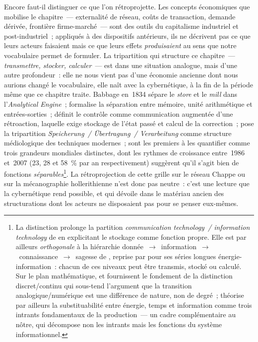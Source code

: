 Encore faut-il distinguer ce que l'on rétroprojette. Les concepts économiques que mobilise le chapitre~--- externalité de réseau, coûts de transaction, demande dérivée, frontière firme-marché~--- sont des outils du capitalisme industriel et post-industriel~; appliqués à des dispositifs antérieurs, ils ne décrivent pas ce que leurs acteurs faisaient mais ce que leurs effets \emph{produisaient} au sens que notre vocabulaire permet de formuler. La tripartition qui structure ce chapitre~--- \emph{transmettre, stocker, calculer}~--- est dans une situation analogue, mais d'une autre profondeur~: elle ne nous vient pas d'une économie ancienne dont nous aurions changé le vocabulaire, elle naît avec la cybernétique, à la fin de la période même que ce chapitre traite. Babbage en~1834 sépare le \emph{store} et le \emph{mill} dans l'\emph{Analytical Engine}~; \textcite{vonneumann_first_1945} formalise la séparation entre mémoire, unité arithmétique et entrées-sorties~; \textcite{wiener_cybernetics_1948} définit le contrôle comme communication augmentée d'une rétroaction, laquelle exige stockage de l'état passé et calcul de la correction~; \textcite{kittler_grammophon_1986} pose la tripartition \emph{Speicherung~/ \"Ubertragung~/ Verarbeitung} comme structure médiologique des techniques modernes~; \textcite{hilbert_worlds_2011} sont les premiers à les quantifier comme trois grandeurs mondiales distinctes, dont les rythmes de croissance entre~1986 et~2007 (23, 28 et 58~\% par an respectivement) suggèrent qu'il s'agit bien de fonctions \emph{séparables}\footnote{La distinction prolonge la partition \emph{communication technology~/ information technology} de \textcite{vanderkooij_invention_2015} en explicitant le stockage comme fonction propre. Elle est par ailleurs \emph{orthogonale} à la hiérarchie donnée~$\rightarrow$~information~$\rightarrow$~connaissance~$\rightarrow$~sagesse de \textcite{ackoff_data_1989}, reprise par \textcite{fouquet_digitalisation_2023} pour ses séries longues énergie-information~: chacun de ces niveaux peut être transmis, stocké ou calculé. Sur le plan mathématique, \textcite{bailly_mathematics_2011} et \textcite{longo_computing_2011} fournissent le fondement de la distinction discret/continu qui sous-tend l'argument que la transition analogique/numérique est une différence de nature, non de degré~; \textcite{spreng_interdependency_2015} théorise par ailleurs la substituabilité entre énergie, temps et information comme trois intrants fondamentaux de la production~--- un cadre complémentaire au nôtre, qui décompose non les intrants mais les fonctions du système informationnel.}. La rétroprojection de cette grille sur le réseau Chappe ou sur la mécanographie hollerithienne n'est donc pas neutre~: c'est une lecture que la cybernétique rend possible, et qui dévoile dans le matériau ancien des structurations dont les acteurs ne disposaient pas pour se penser eux-mêmes.

